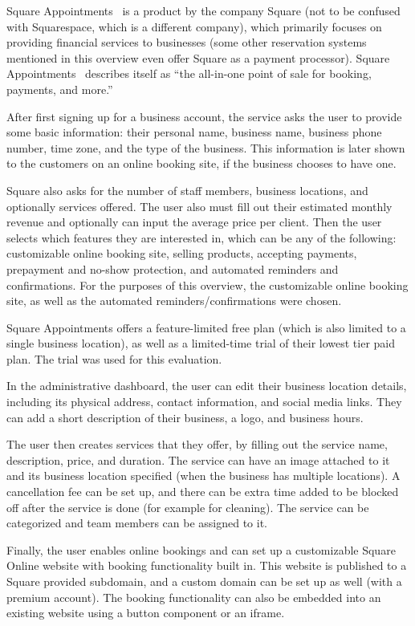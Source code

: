 Square Appointments~\cite{square} is a product by the company Square (not to be confused with Squarespace, which is a different company), which primarily focuses on providing financial services to businesses (some other reservation systems mentioned in this overview even offer Square as a payment processor). Square Appointments~\cite{square} describes itself as \enquote{the all-in-one point of sale for
booking, payments, and more.}

After first signing up for a business account, the service asks the user to provide some basic information: their personal name, business name, business phone number, time zone, and the type of the business. This information is later shown to the customers on an online booking site, if the business chooses to have one.

Square also asks for the number of staff members, business locations, and optionally services offered. The user also must fill out their estimated monthly revenue and optionally can input the average price per client. Then the user selects which features they are interested in, which can be any of the following: customizable online booking site, selling products, accepting payments, prepayment and no-show protection, and automated reminders and confirmations. For the purposes of this overview, the customizable online booking site, as well as the automated reminders/confirmations were chosen.

Square Appointments offers a feature-limited free plan (which is also limited to a single business location), as well as a limited-time trial of their lowest tier paid plan. The trial was used for this evaluation.

In the administrative dashboard, the user can edit their business location details, including its physical address, contact information, and social media links. They can add a short description of their business, a logo, and business hours.

The user then creates services that they offer, by filling out the service name, description, price, and duration. The service can have an image attached to it and its business location specified (when the business has multiple locations). A cancellation fee can be set up, and there can be extra time added to be blocked off after the service is done (for example for cleaning). The service can be categorized and team members can be assigned to it.

Finally, the user enables online bookings and can set up a customizable Square Online website with booking functionality built in. This website is published to a Square provided subdomain, and a custom domain can be set up as well (with a premium account). The booking functionality can also be embedded into an existing website using a button component or an iframe.

